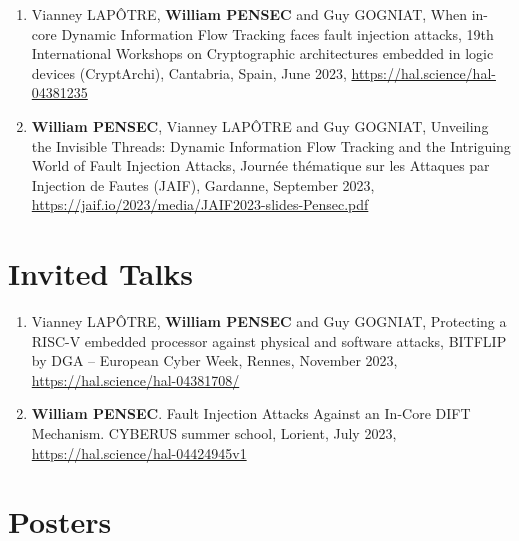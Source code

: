 \begin{enumerate}
    \item Vianney LAPÔTRE, \textbf{William PENSEC} and Guy GOGNIAT, When in-core Dynamic Information Flow Tracking faces fault injection attacks, 19th International Workshops on Cryptographic architectures embedded in logic devices (CryptArchi), Cantabria, Spain, June 2023, \url{https://hal.science/hal-04381235}
    \item \textbf{William PENSEC}, Vianney LAPÔTRE and Guy GOGNIAT, Unveiling the Invisible Threads: Dynamic Information Flow Tracking and the Intriguing World of Fault Injection Attacks, Journée thématique sur les Attaques par Injection de Fautes (JAIF), Gardanne, September 2023, \url{https://jaif.io/2023/media/JAIF2023-slides-Pensec.pdf}
\end{enumerate}
\section{Invited Talks}

\begin{enumerate}
    \item Vianney LAPÔTRE, \textbf{William PENSEC} and Guy GOGNIAT, Protecting a RISC-V embedded processor against physical and software attacks, BITFLIP by DGA -- European Cyber Week, Rennes, November 2023, \url{https://hal.science/hal-04381708/}
    \item \textbf{William PENSEC}. Fault Injection Attacks Against an In-Core DIFT Mechanism. CYBERUS summer school, Lorient, July 2023, \url{https://hal.science/hal-04424945v1}
\end{enumerate}
\section{Posters}

